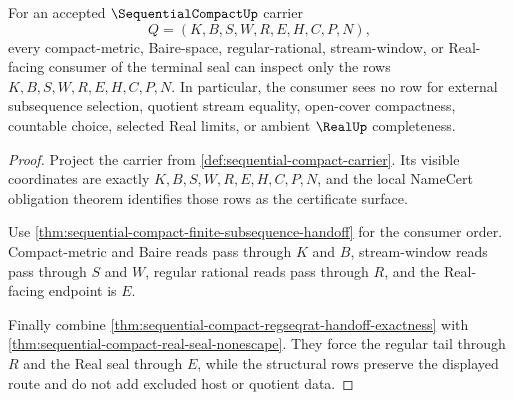 \begin{theorem}
\label{thm:sequential-compact-real-seal-consumer-boundary}
For an accepted $\SequentialCompactUp$ carrier
$$
Q=(K,B,S,W,R,E,H,C,P,N),
$$
every compact-metric, Baire-space, regular-rational, stream-window, or Real-facing consumer of the terminal seal can inspect only the rows $K,B,S,W,R,E,H,C,P,N$. In particular, the consumer sees no row for external subsequence selection, quotient stream equality, open-cover compactness, countable choice, selected Real limits, or ambient $\RealUp$ completeness.
\end{theorem}
\begin{proof}
Project the carrier from \autoref{def:sequential-compact-carrier}. Its visible coordinates are exactly $K,B,S,W,R,E,H,C,P,N$, and the local NameCert obligation theorem identifies those rows as the certificate surface.

Use \autoref{thm:sequential-compact-finite-subsequence-handoff} for the consumer order. Compact-metric and Baire reads pass through $K$ and $B$, stream-window reads pass through $S$ and $W$, regular rational reads pass through $R$, and the Real-facing endpoint is $E$.

Finally combine \autoref{thm:sequential-compact-regseqrat-handoff-exactness} with \autoref{thm:sequential-compact-real-seal-nonescape}. They force the regular tail through $R$ and the Real seal through $E$, while the structural rows preserve the displayed route and do not add excluded host or quotient data.
\end{proof}

